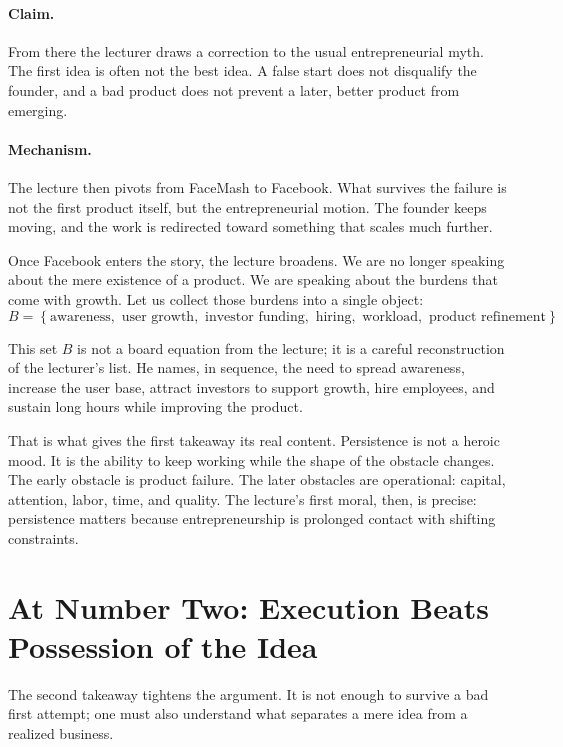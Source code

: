 \paragraph{Claim.}
From there the lecturer draws a correction to the usual entrepreneurial myth. The first idea is often not the best idea. A false start does not disqualify the founder, and a bad product does not prevent a later, better product from emerging.

\paragraph{Mechanism.}
The lecture then pivots from FaceMash to Facebook. What survives the failure is not the first product itself, but the entrepreneurial motion. The founder keeps moving, and the work is redirected toward something that scales much further.

Once Facebook enters the story, the lecture broadens. We are no longer speaking about the mere existence of a product. We are speaking about the burdens that come with growth. Let us collect those burdens into a single object:
\begin{equation}
B
=
\left\{
\text{awareness},
\text{ user growth},
\text{ investor funding},
\text{ hiring},
\text{ workload},
\text{ product refinement}
\right\}.
\end{equation}

This set \(B\) is not a board equation from the lecture; it is a careful reconstruction of the lecturer's list. He names, in sequence, the need to spread awareness, increase the user base, attract investors to support growth, hire employees, and sustain long hours while improving the product.

That is what gives the first takeaway its real content. Persistence is not a heroic mood. It is the ability to keep working while the shape of the obstacle changes. The early obstacle is product failure. The later obstacles are operational: capital, attention, labor, time, and quality. The lecture's first moral, then, is precise: persistence matters because entrepreneurship is prolonged contact with shifting constraints.

\section{At Number Two: Execution Beats Possession of the Idea}

The second takeaway tightens the argument. It is not enough to survive a bad first attempt; one must also understand what separates a mere idea from a realized business.

